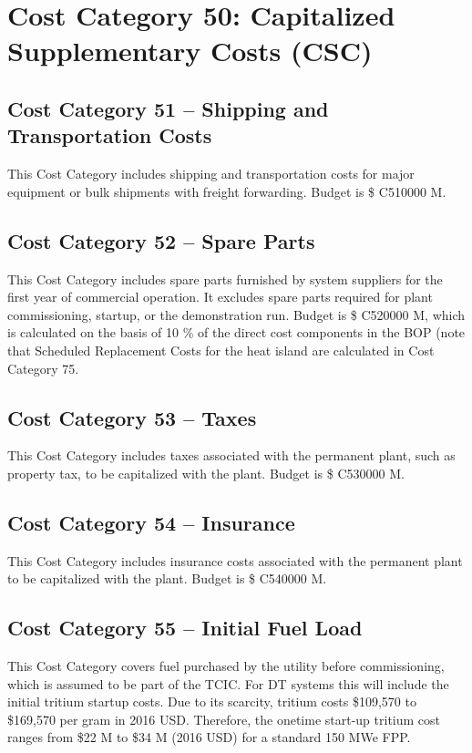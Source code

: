 
\section{Cost Category 50: Capitalized Supplementary Costs (CSC)}


\subsection*{Cost Category 51 – Shipping and Transportation Costs}
This Cost Category includes shipping and transportation costs for major equipment or bulk shipments with freight forwarding. Budget is \$ C510000 M.

\subsection*{Cost Category 52 – Spare Parts}
This Cost Category includes spare parts furnished by system suppliers for the first year of commercial operation. It excludes spare parts required for plant commissioning, startup, or the demonstration run.  Budget is \$ C520000 M, which is calculated on the basis of 10 \% of the direct cost components in the BOP (note that Scheduled Replacement Costs for the heat island are calculated in Cost Category 75.

\subsection*{Cost Category 53 – Taxes}
This Cost Category includes taxes associated with the permanent plant, such as property tax, to be capitalized with the plant. Budget is \$ C530000 M.

\subsection*{Cost Category 54 – Insurance}
This Cost Category includes insurance costs associated with the permanent plant to be capitalized with the plant.  Budget is \$ C540000 M.

\subsection*{Cost Category 55 – Initial Fuel Load}
This Cost Category covers fuel purchased by the utility before commissioning, which is assumed to be part of the TCIC. For DT systems this will include the initial tritium startup costs.  Due to its scarcity, tritium costs \$109,570 to \$169,570 per gram in 2016 USD. Therefore, the onetime start-up tritium cost ranges from \$22 M to \$34 M (2016 USD) for a standard 150 MWe FPP. \\

